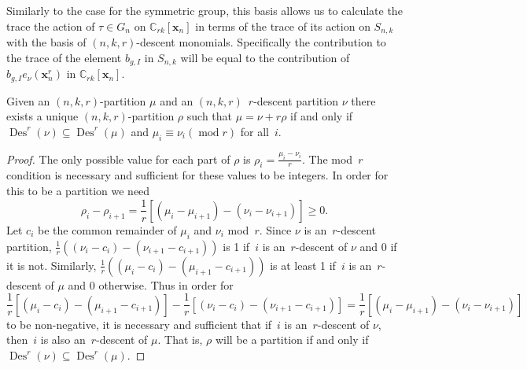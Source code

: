 \documentclass[10pt]{article}
\newcommand{\modrm}{\operatorname{mod}}\newcommand{\Des}{\operatorname{Des}}\newcommand{\des}{\operatorname{des}}
\begin{document}
Similarly to the case for the symmetric group, this basis allows us to calculate the trace the action of $\tau\in G_n$ on $ 
\mathbb{C}_{rk}[\mathbf{x}_n]$ in terms of the trace of its action on $S_{n,k}$ with the basis of $(n,k,r)$-descent monomials. 
Specifically the contribution to the trace of the element $b_{g,I}$ in $S_{n,k}$ will be equal to the contribution of 
$b_{g,I}e_\nu(\mathbf{x}_n^r)$ in $\mathbb{C}_{rk}[\mathbf{x}_n]$.


























	
\begin{lemm}

\label{DecomLem2}
 Given an $(n,k,r)$-partition $\mu$ and an $(n,k,r)$~$r$-descent partition $\nu$ there exists a unique $(n,k,r)$-partition 
$\rho$ such that $\mu=\nu+r\rho$ if and only if $\Des ^r(\nu)\subseteq \Des ^r(\mu)$ and $\mu_i\equiv \nu_i (\modrm r)$ for 
all~$i$.

	\begin{proof}
		The only possible value for each part of $\rho$ is $\rho_i=\frac{\mu_i-\nu_i}{r}$. The mod~$r$ condition is necessary 
and sufficient for these values to be integers. In order for this to be a partition we 
need
\begin{equation}
\rho_i-\rho_{i+1}=\frac{1}{r}[(\mu_i-\mu_{i+1})-(\nu_i-\nu_{i+1})]\geq 0.
\end{equation}
 Let $c_i$ 
be the common remainder of $\mu_i$ and $\nu_i$ mod~$r$. Since $\nu$ is an~$r$-descent partition, 
$\frac{1}{r}((\nu_i-c_i)-(\nu_{i+1}-c_{i+1}))$ is 1 if~$i$ is an~$r$-descent of $\nu$ and 0 if it is not. Similarly, 
$\frac{1}{r}((\mu_i-c_i)-(\mu_{i+1}-c_{i+1}))$ is at least 1 if~$i$ is an~$r$-descent of $\mu$ and 0 otherwise. Thus 
in order 
for
\begin{equation}
\frac{1}{r}[(\mu_i-c_i)-(\mu_{i+1}-c_{i+1})]-\frac{1}{r}[(\nu_i-c_i)-(\nu_{i+1}-c_{i+1})]=\frac{1}{r}[
(\mu_i-\mu_{i+1})-(\nu_i-\nu_{i+1})]
\end{equation}
to be non-negative, it is necessary and sufficient that if~$i$ is an~$r$-descent of $\nu$, then~$i$ is also an~$r$-descent of $\mu$. That is, $\rho$ will be a partition if and only if 
$\Des ^r(\nu)\subseteq \Des ^r(\mu)$.
	\end{proof}
\end{lemm}
\end{document}
